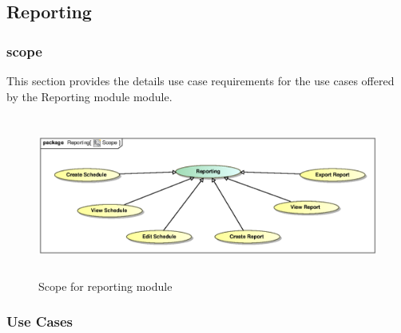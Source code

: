 \subsection{Reporting}

\subsubsection{scope}
\par{This section provides the details use case requirements for the use cases offered by the Reporting module
module.}

\begin{figure}[h]
\includegraphics[height=200px, width=500px]{epsImages/Reporting/ReportScope.eps}
\caption{Scope for reporting module}
\end{figure}

\subsubsection{Use Cases}

